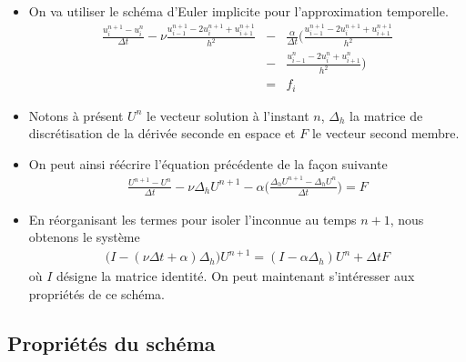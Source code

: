 \begin{frame}
    \begin{itemize}
\item On va utiliser le schéma d'Euler implicite pour l'approximation 
temporelle.
\begin{eqnarray*}\label{schema_DF_points}
    \frac{u_i^{n+1}-u_i^n}{\Delta t} - \nu \frac{u_{i-1}^{n+1}-2u_i^{n+1}+u_{i+1}^{n+1}}{h^2} &-& \frac{\alpha}{\Delta t}\bigg( \frac{u_{i-1}^{n+1}
    -2u_i^{n+1}+u_{i+1}^{n+1}}{h^2}\\
    &-&\frac{u_{i-1}^{n}-2u_i^{n}+u_{i+1}^{n}}{h^2}\bigg) \\
    &=& f_i
\end{eqnarray*}
        \item Notons à présent $U^n$ le vecteur solution à l'instant $n$, 
$\Delta_h$ la matrice de discrétisation de la dérivée seconde en 
espace et $F$ le vecteur second membre. 
\item On peut ainsi réécrire l'équation précédente de la façon suivante
\begin{eqnarray*}
    \frac{U^{n+1} - U^n}{\Delta t} - \nu \Delta _h U^{n+1} - \alpha\bigg(\frac{\Delta_h U^{n+1} - \Delta_h U^n}{\Delta t} \bigg) = F
\end{eqnarray*}
\item En réorganisant les termes pour isoler l'inconnue au temps $n+1$, nous obtenons le système 
\begin{eqnarray}\label{schema_DF}
    \big(I - (\nu \Delta t + \alpha)\Delta_h\big)  U^{n+1} = (I - \alpha \Delta_h) U^n + \Delta t F
\end{eqnarray}
où $I$ désigne la matrice identité. On peut maintenant s'intéresser aux propriétés de ce schéma.
    \end{itemize}
\end{frame}

\subsection{Propriétés du schéma}

